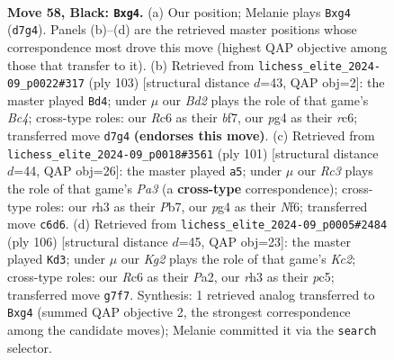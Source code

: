 \documentclass[11pt]{article}
\begin{document}
\clearpage

\begin{figure}[p]\centering
\begin{subfigure}{0.46\textwidth}\centering
\resizebox{\linewidth}{!}{%
\newchessgame
\chessboard[
  setfen={1R6/3b2k1/2r5/1p6/r3P1PB/7R/2n2P2/7K b - - 0 58},
  showmover=false,
  pgfstyle=straightmove, color=movearrow, markmove={d7-g4}
]}
\caption{}
\end{subfigure}\hfill
\begin{subfigure}{0.46\textwidth}\centering
\resizebox{\linewidth}{!}{%
\newchessgame
\chessboard[
  setfen={8/5B2/P1R2p2/2b2P1P/K3p3/8/5k2/6r1 b - - 2 52},
  showmover=false,
  pgfstyle=straightmove, color=movearrow, markmove={c5-d4}
]}
\caption{}
\end{subfigure}
\\[4pt]
\begin{subfigure}{0.46\textwidth}\centering
\resizebox{\linewidth}{!}{%
\newchessgame
\chessboard[
  setfen={8/1p3k2/p2K1n2/1r6/8/3P3P/1P3R2/6R1 b - - 4 51},
  showmover=false,
  pgfstyle=straightmove, color=movearrow, markmove={a6-a5}
]}
\caption{}
\end{subfigure}\hfill
\begin{subfigure}{0.46\textwidth}\centering
\resizebox{\linewidth}{!}{%
\newchessgame
\chessboard[
  setfen={5k1r/3b3P/8/2p2pR1/3p3R/8/P1K5/8 w - - 0 54},
  showmover=false,
  pgfstyle=straightmove, color=movearrow, markmove={c2-d3}
]}
\caption{}
\end{subfigure}
\caption{\textbf{Move 58, Black: \texttt{Bxg4}.} (a) Our position; Melanie plays \texttt{Bxg4} (\texttt{d7g4}). Panels (b)--(d) are the retrieved master positions whose correspondence most drove this move (highest QAP objective among those that transfer to it). (b) Retrieved from \texttt{lichess\_elite\_2024-09\_p0022\#317} (ply 103) [structural distance $d$=43, QAP obj=2]: the master played \texttt{Bd4}; under $\mu$ our \emph{Bd2} plays the role of that game's \emph{Bc4}; cross-type roles: our \emph{R}c6 as their \emph{b}f7, our \emph{p}g4 as their \emph{r}c6; transferred move \texttt{d7g4} \textbf{(endorses this move)}. (c) Retrieved from \texttt{lichess\_elite\_2024-09\_p0018\#3561} (ply 101) [structural distance $d$=44, QAP obj=26]: the master played \texttt{a5}; under $\mu$ our \emph{Rc3} plays the role of that game's \emph{Pa3} (a \textbf{cross-type} correspondence); cross-type roles: our \emph{r}h3 as their \emph{P}b7, our \emph{p}g4 as their \emph{N}f6; transferred move \texttt{c6d6}. (d) Retrieved from \texttt{lichess\_elite\_2024-09\_p0005\#2484} (ply 106) [structural distance $d$=45, QAP obj=23]: the master played \texttt{Kd3}; under $\mu$ our \emph{Kg2} plays the role of that game's \emph{Kc2}; cross-type roles: our \emph{R}c6 as their \emph{P}a2, our \emph{r}h3 as their \emph{p}c5; transferred move \texttt{g7f7}. Synthesis: 1 retrieved analog transferred to \texttt{Bxg4} (summed QAP objective 2, the strongest correspondence among the candidate moves); Melanie committed it via the \texttt{search} selector.}
\label{fig:thought-m115}
\end{figure}
\end{document}
